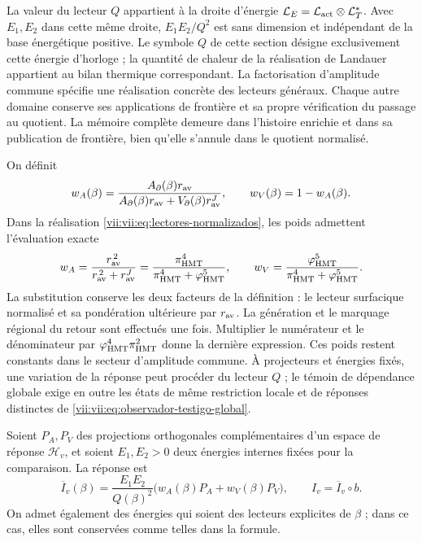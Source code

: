 La valeur du lecteur \(Q\) appartient à la droite d'énergie \(\mathcal L_E=\mathcal L_{\rm act}\otimes\mathcal L_T^*\). Avec \(E_1,E_2\) dans cette même droite, \(E_1E_2/Q^2\) est sans dimension et indépendant de la base énergétique positive. Le symbole \(Q\) de cette section désigne exclusivement cette énergie d'horloge ; la quantité de chaleur de la réalisation de Landauer appartient au bilan thermique correspondant. La factorisation d'amplitude commune spécifie une réalisation concrète des lecteurs généraux. Chaque autre domaine conserve ses applications de frontière et sa propre vérification du passage au quotient. La mémoire complète demeure dans l'histoire enrichie et dans sa publication de frontière, bien qu'elle s'annule dans le quotient normalisé.


On définit
\[
 w_A(\beta)=
 \frac{A_\partial(\beta)r_{\rm av}}
 {A_\partial(\beta)r_{\rm av}+V_\partial(\beta)r_{\rm av}^{J}},
 \qquad w_V(\beta)=1-w_A(\beta).
\]
Dans la réalisation \eqref{vii:vii:eq:lectores-normalizados}, les poids
admettent l'évaluation exacte
\begin{equation}
 w_A=\frac{r_{\rm av}^{\,2}}{r_{\rm av}^{\,2}+r_{\rm av}^{J}}
     =\frac{\pi_{\rm HMT}^{4}}
            {\pi_{\rm HMT}^{4}+\varphi_{\rm HMT}^{5}},\qquad
 w_V=\frac{\varphi_{\rm HMT}^{5}}
            {\pi_{\rm HMT}^{4}+\varphi_{\rm HMT}^{5}}.
 \label{vii:vii:eq:pesos-amplitud-comun}
\end{equation}
La substitution conserve les deux facteurs de la définition : le lecteur
surfacique normalisé et sa pondération ultérieure par \(r_{\rm av}\).
La génération et le marquage régional du retour sont effectués une fois.
Multiplier le numérateur
et le dénominateur par \(\varphi_{\rm HMT}^4\pi_{\rm HMT}^2\)
donne la dernière expression. Ces poids restent constants dans le
secteur d'amplitude commune. À projecteurs et énergies fixés, une
variation de la réponse peut procéder du lecteur \(Q\) ;
le témoin de dépendance globale exige en outre les états de
même restriction locale et de réponses distinctes de
\eqref{vii:vii:eq:observador-testigo-global}.


Soient \(P_A,P_V\) des projections orthogonales complémentaires d'un
espace de réponse \(\mathcal H_v\), et soient \(E_1,E_2>0\)
deux énergies internes fixées pour la comparaison. La réponse est
\begin{equation}
 \overline I_v(\beta)=\frac{E_1E_2}{Q(\beta)^2}
       \bigl(w_A(\beta)P_A+w_V(\beta)P_V\bigr),
 \qquad I_v=\overline I_v\circ b.
 \label{vii:vii:eq:observador-respuesta-ponderada}
\end{equation}
On admet également des énergies qui soient des lecteurs explicites de
\(\beta\) ; dans ce cas, elles sont conservées comme telles dans la formule.

